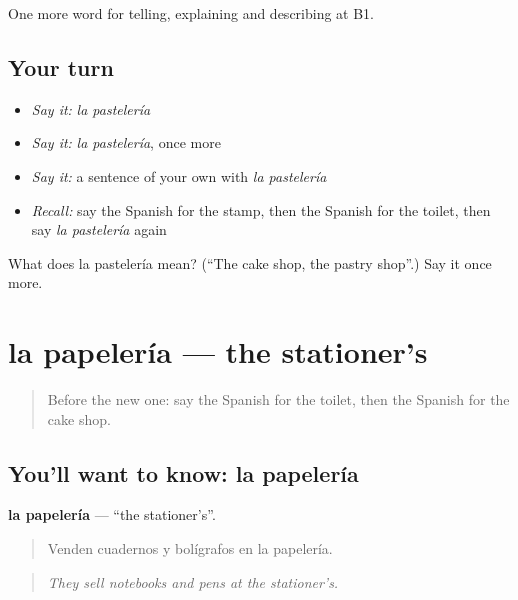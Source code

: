 \begin{grammarlens}[title={What you've built}]
One more word for telling, explaining and describing at B1.
\end{grammarlens}

\subsection*{Your turn}
\begin{itemize}
\raggedright
  \item \emph{Say it:} \emph{la pastelería}
  \item \emph{Say it:} \emph{la pastelería}, once more
  \item \emph{Say it:} a sentence of your own with \emph{la pastelería}
  \item \emph{Recall:} say the Spanish for the stamp, then the Spanish for the toilet, then say \emph{la pastelería} again
\end{itemize}

\begin{tcolorbox}[breakable,colback=teal!4,colframe=teal!35!black,title={Before you move on}]
What does la pastelería mean? (\textquotedblleft{}The cake shop, the pastry shop\textquotedblright{}.) Say it once more.
\end{tcolorbox}
\section[la papelería]{la papelería — the stationer’s}

\label{lesson:ES-C680-papeleria}



\begin{quote}
Before the new one: say the Spanish for the toilet, then the Spanish for the cake shop.
\end{quote}

\subsection*{You'll want to know: la papelería}
\textbf{la papelería} — \textquotedblleft{}the stationer’s\textquotedblright{}.

\begin{quote}
Venden cuadernos y bolígrafos en la papelería.
\end{quote}

\begin{quote}
\emph{They sell notebooks and pens at the stationer’s.}
\end{quote}

